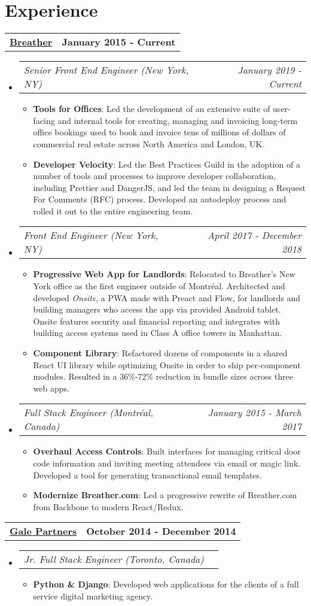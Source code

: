 \documentclass[letterpaper,10.8pt]{article}
\makeatletter
\newcommand{\resumeItem}[2]{
  \item\small{
    \textbf{#1}{: #2 \vspace{-2pt}}
  }
}
\newcommand{\jobLineItem}[2]{
  \vspace{0pt}\item[]
    \begin{tabular*}{0.98\textwidth}{l@{\extracolsep{\fill}}r}
      \textit{#1} & \textit{\small #2} \\
    \end{tabular*}\vspace{-4pt}
}
\newcommand{\employerTitle}[3]{
  \begin{tabular*}{1\textwidth}{l@{\extracolsep{\fill}}r}
    \href{#1}{\textbf{#2}} & \textbf{#3} \\
  \end{tabular*}\vspace{-4pt}
}
\newcommand{\resumeSubHeadingListStart}{\begin{itemize}[leftmargin=*]}
\newcommand{\resumeSubHeadingListEnd}{\end{itemize}}
\newcommand{\resumeItemListStart}{\begin{itemize}}
\newcommand{\resumeItemListEnd}{\end{itemize}\vspace{-5pt}}
\makeatother
\begin{document}
\section{Experience}
  \employerTitle
    {https://breather.com}{Breather}{January 2015 - Current}
  \resumeSubHeadingListStart
    \jobLineItem
        {Senior Front End Engineer (New York, NY)}{January 2019 - Current}
    \resumeItemListStart
        \resumeItem{Tools for Offices}
        {Led the development of an extensive suite of user-facing and internal tools for creating, managing and invoicing long-term office bookings used to book and invoice tens of millions of dollars of commercial real estate across North America and London, UK.}
        \resumeItem{Developer Velocity}
        {Led the Best Practices Guild in the adoption of a number of tools and processes to improve developer collaboration, including Prettier and DangerJS, and led the team in designing a Request For Comments (RFC) process. Developed an autodeploy process and rolled it out to the entire engineering team.}
    \resumeItemListEnd
    \jobLineItem
        {Front End Engineer (New York, NY)}{April 2017 - December 2018}
    \resumeItemListStart
        \resumeItem{Progressive Web App for Landlords}
        {Relocated to Breather’s New York office as the first engineer outside of Montréal. Architected and developed \textit{Onsite}, a PWA made with Preact and Flow, for landlords and building managers who access the app via provided Android tablet. Onsite features security and financial reporting and integrates with building access systems used in Class A office towers in Manhattan.}
        \resumeItem{Component Library}
        {Refactored dozens of components in a shared React UI library while optimizing Onsite in order to ship per-component modules. Resulted in a 36\%-72\% reduction in bundle sizes across three web apps.}
      \resumeItemListEnd
    \jobLineItem
		    {Full Stack Engineer (Montréal, Canada)}{January 2015 - March 2017}
		\resumeItemListStart
        \resumeItem{Overhaul Access Controls}
        {Built interfaces for managing critical door code information and inviting meeting attendees via email or magic link. Developed a tool for generating transactional email templates.}
        \resumeItem{Modernize Breather.com}
        {Led a progressive rewrite of Breather.com from Backbone to modern React/Redux.}
    \resumeItemListEnd
    \resumeSubHeadingListEnd

  \employerTitle
  {https://gale.agency}{Gale Partners}{October 2014 - December 2014}
  \resumeSubHeadingListStart
  \jobLineItem
		{Jr. Full Stack Engineer (Toronto, Canada)}{}
		\resumeItemListStart
      \resumeItem{Python \& Django}
        {Developed web applications for the clients of a full service digital marketing agency.}
      \resumeItemListEnd
    \resumeSubHeadingListEnd
\end{document}
